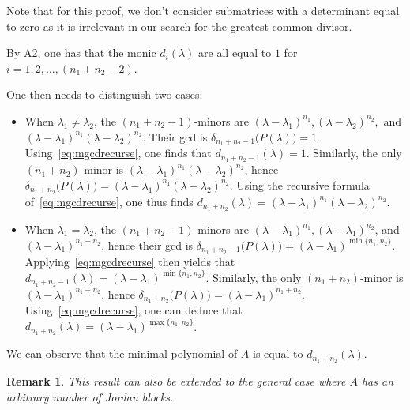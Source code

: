 \documentclass[11pt]{article}
\newtheorem*{remark}{Remark}
\begin{document}
Note that for this proof, we don't consider submatrices with a determinant equal to zero as it is irrelevant in our search for the greatest common divisor.

By A2, one has that the monic $d_i(\lambda)$ are all equal to \(1\) for $i = 1, 2, \dots, (n_1 + n_2 - 2)$.


One then needs to distinguish two cases:
\begin{itemize}
\item When $\lambda_1 \neq \lambda_2$, the \((n_1 + n_2 - 1)\)-minors are \((\lambda - \lambda_1)^{n_1},(\lambda - \lambda_2)^{n_2},\) and \((\lambda - \lambda_1)^{n_1}(\lambda - \lambda_2)^{n_2}\).
Their gcd is \(\delta_{n_1 + n_2 - 1}\big(P(\lambda)\big) = 1\).
Using~\eqref{eq:mgcdrecurse}, one finds that \(d_{n_1 + n_2 - 1}(\lambda) = 1\).
Similarly, the only \((n_1 + n_2)\)-minor is \((\lambda - \lambda_1)^{n_1}(\lambda - \lambda_2)^{n_2}\), hence \(\delta_{n_1 + n_2}\big(P(\lambda)\big) = (\lambda - \lambda_1)^{n_1}(\lambda - \lambda_2)^{n_2}\).
Using the recursive formula of~\eqref{eq:mgcdrecurse}, one thus finds \(d_{n_1 + n_2}(\lambda) = (\lambda - \lambda_1)^{n_1}(\lambda - \lambda_2)^{n_2}\).
\item When $\lambda_1 = \lambda_2$, the \((n_1 + n_2 - 1)\)-minors are \((\lambda - \lambda_1)^{n_1}, (\lambda - \lambda_1)^{n_2}\), and \((\lambda - \lambda_1)^{n_1 + n_2}\), hence their gcd is \(\delta_{n_1 + n_2 - 1}\big(P(\lambda)\big) = (\lambda - \lambda_1)^{\min\{n_1, n_2\}}\).
Applying~\eqref{eq:mgcdrecurse} then yields that \(d_{n_1 + n_2 - 1}(\lambda) = (\lambda - \lambda_1)^{\min\{n_1, n_2\}}\).
Similarly, the only \((n_1 + n_2)\)-minor is \((\lambda - \lambda_1)^{n_1 + n_2}\), hence \(\delta_{n_1 + n_2}\big(P(\lambda)\big) = (\lambda - \lambda_1)^{n_1 + n_2}\).
Using~\eqref{eq:mgcdrecurse}, one can deduce that \(d_{n_1 + n_2}(\lambda) = (\lambda - \lambda_1)^{\max\{n_1, n_2\}}\).
\end{itemize}

We can observe that the minimal polynomial of $A$ is equal to $d_{n_1+n_2}(\lambda)$.

\begin{remark}
This result can also be extended to the general case where \(A\) has an arbitrary number of Jordan blocks.
\end{remark}
\end{document}
